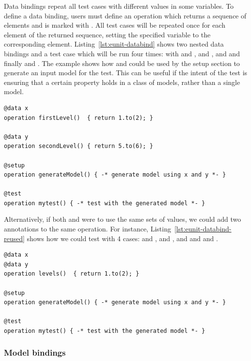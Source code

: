 Data bindings repeat all test cases with different values in some variables. To define a data binding, users must define an operation which returns a sequence of elements and is marked with . All test cases will be repeated once for each element of the returned sequence, setting the specified variable to the corresponding element. Listing~\ref{lst:eunit-databind} shows two nested data bindings and a test case which will be run four times: with  and ,  and ,  and  and finally  and . The example shows how  and  could be used by the setup section to generate an input model for the test. This can be useful if the intent of the test is ensuring that a certain property holds in a class of models, rather than a single model.

\begin{lstlisting}[language=EOL,caption=Example of a 2-level data binding,label=lst:eunit-databind,columns=fixed,float]
@data x
operation firstLevel()  { return 1.to(2); }

@data y
operation secondLevel() { return 5.to(6); }

@setup
operation generateModel() { -* generate model using x and y *- }

@test
operation mytest() { -* test with the generated model *- }
\end{lstlisting}

Alternatively, if both  and  were to use the same sets of values, we could add two  annotations to the same operation. For instance, Listing~\ref{lst:eunit-databind-reused} shows how we could test with 4 cases:  and ,  and ,  and  and  and .

\begin{lstlisting}[language=EOL,caption=Example of reusing the same operation for several data bindings,label=lst:eunit-databind-reused,columns=fixed,float]
@data x
@data y
operation levels()  { return 1.to(2); }

@setup
operation generateModel() { -* generate model using x and y *- }

@test
operation mytest() { -* test with the generated model *- }
\end{lstlisting}

\subsubsection{Model bindings}

